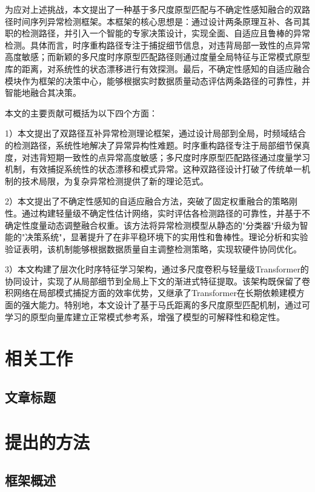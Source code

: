 \documentclass{setp-new}
\begin{document}
为应对上述挑战，本文提出了一种基于多尺度原型匹配与不确定性感知融合的双路径时间序列异常检测框架。本框架的核心思想是：通过设计两条原理互补、各司其职的检测路径，并引入一个智能的专家决策设计，实现全面、自适应且鲁棒的异常检测。具体而言，时序重构路径专注于捕捉细节信息，对违背局部一致性的点异常高度敏感；而新颖的多尺度时序原型匹配路径则通过度量全局特征与正常模式原型库的距离，对系统性的状态漂移进行有效探测。最后，不确定性感知的自适应融合模块作为框架的决策中心，能够根据实时数据质量动态评估两条路径的可靠性，并智能地融合其决策。

本文的主要贡献可概括为以下四个方面：

1）本文提出了双路径互补异常检测理论框架，通过设计局部到全局，时频域结合的检测路径，系统性地解决了异常异构性难题。时序重构路径专注于局部细节保真度，对违背短期一致性的点异常高度敏感；多尺度时序原型匹配路径通过度量学习机制，有效捕捉系统性的状态漂移和模式异常。这种双路径设计打破了传统单一机制的技术局限，为复杂异常检测提供了新的理论范式。

2）本文提出了不确定性感知的自适应融合方法，突破了固定权重融合的策略刚性。通过构建轻量级不确定性估计网络，实时评估各检测路径的可靠性，并基于不确定性度量动态调整融合权重。该方法将异常检测模型从静态的"分类器"升级为智能的"决策系统"，显著提升了在非平稳环境下的实用性和鲁棒性。理论分析和实验验证表明，该机制能够根据数据质量自主调整检测策略，实现软硬件协同优化。

3）本文构建了层次化时序特征学习架构，通过多尺度卷积与轻量级Transformer的协同设计，实现了从局部细节到全局上下文的渐进式特征提取。该架构既保留了卷积网络在局部模式捕捉方面的效率优势，又继承了Transformer在长期依赖建模方面的强大能力。特别地，本文设计了基于马氏距离的多尺度原型匹配机制，通过可学习的原型向量库建立正常模式参考系，增强了模型的可解释性和稳定性。


\section{相关工作}

\subsection{文章标题}

\section{提出的方法}

\subsection{框架概述}
\end{document}

